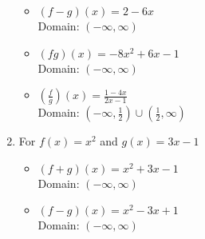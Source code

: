 \begin{enumerate}
\begin{multicols}{2}
\begin{itemize}
      \columnbreak
      
\item $(f-g)(x) = 2-6x$ \\
      Domain:  $(-\infty, \infty)$


\end{itemize}

\end{multicols}

\begin{multicols}{2}

\begin{itemize}

\item $(fg)(x) = -8x^2+6x-1$ \\
      Domain: $(-\infty, \infty)$
      
      \vfill
      
      \columnbreak
      
\item $\left(\frac{f}{g}\right)(x) = \frac{1-4x}{2x-1}$ \\
      Domain:  $\left(-\infty, \frac{1}{2} \right) \cup \left(\frac{1}{2}, \infty \right)$


\end{itemize}

\end{multicols}


\item For $f(x) = x^2$ and $g(x) = 3x-1$

\begin{multicols}{2}

\begin{itemize}

\item $(f+g)(x) = x^2+3x-1$ \\
      Domain: $(-\infty, \infty)$
      
      \vfill
      
      \columnbreak
      
\item $(f-g)(x) = x^2-3x+1$ \\
      Domain:  $(-\infty, \infty)$


\end{itemize}

\end{multicols}

\begin{multicols}{2}

\begin{itemize}


\end{itemize}
\end{multicols}
\end{enumerate}
